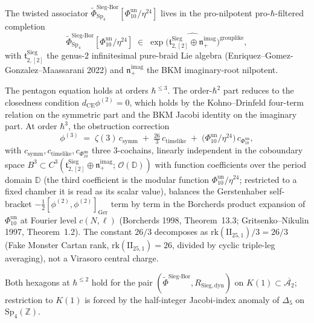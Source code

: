 \begin{theorem}
\label{thm:qca-pentagon-hexagon-sieg-bor}
The twisted associator
$\widetilde{\Phi}^{\mathrm{Sieg\text{-}Bor}}_{\mathrm{Sp}_4}[\Phi_{10}^{\mathrm{un}}/\eta^{24}]$
lives in the pro-nilpotent pro-$\hbar$-filtered completion
\[
 \widetilde{\Phi}^{\mathrm{Sieg\text{-}Bor}}_{\mathrm{Sp}_4}[\Phi_{10}^{\mathrm{un}}/\eta^{24}]
 \;\in\;
 \exp\bigl(\widehat{\mathfrak{t}^{\mathrm{Sieg}}_{2,[2]}\oplus\mathfrak{n}_+^{\mathrm{imag}}}\bigr)^{\mathrm{grouplike}},
\]
with $\mathfrak{t}^{\mathrm{Sieg}}_{2,[2]}$ the genus-$2$ infinitesimal pure-braid
Lie algebra (Enriquez--Gomez-Gonzalez--Maassarani 2022) and
$\mathfrak{n}_+^{\mathrm{imag}}$ the BKM imaginary-root nilpotent.

The pentagon equation holds at orders $\hbar^{\leq 3}$. The order-$\hbar^2$ part
reduces to the closedness condition $d_{\mathrm{CE}}\phi^{(2)} = 0$, which holds
by the Kohno--Drinfeld four-term relation on the symmetric part and the BKM
Jacobi identity on the imaginary part. At order $\hbar^3$, the obstruction
correction
\[
 \phi^{(3)}
 \;=\;
 \zeta(3)\,c_{\mathrm{symm}}
 \;+\;
 \tfrac{26}{3}\,c_{\mathrm{timelike}}
 \;+\;
 \bigl(\Phi_{10}^{\mathrm{un}}/\eta^{24}\bigr)\,c_{\Phi_{10}^{\mathrm{un}}},
\]
with $c_{\mathrm{symm}},c_{\mathrm{timelike}},c_{\Phi_{10}^{\mathrm{un}}}$ three
$3$-cochains, linearly independent in the coboundary space
$B^3 \subset C^3(\mathfrak{t}^{\mathrm{Sieg}}_{2,[2]}\oplus\mathfrak{n}_+^{\mathrm{imag}};\,\mathcal{O}(\mathbb{D}))$
with function coefficients over the period domain $\mathbb{D}$ (the third
coefficient is the modular function $\Phi_{10}^{\mathrm{un}}/\eta^{24}$;
restricted to a fixed chamber it is read as its scalar value),
balances the Gerstenhaber self-bracket $-\frac{1}{2}[\phi^{(2)},\phi^{(2)}]_{\mathrm{Ger}}$
term by term in the Borcherds product expansion of $\Phi_{10}^{\mathrm{un}}$ at Fourier level
$c(N,\ell)$ (Borcherds 1998, Theorem~13.3; Gritsenko--Nikulin 1997, Theorem~1.2).
The constant $26/3$ decomposes as $\mathrm{rk}(\mathrm{II}_{25,1})/3 = 26/3$ (Fake Monster
Cartan rank, $\mathrm{rk}(\mathrm{II}_{25,1}) = 26$, divided by cyclic triple-leg
averaging), not a Virasoro central charge.

Both hexagons at $\hbar^{\leq 2}$ hold for the pair
$(\widetilde{\Phi}^{\mathrm{Sieg\text{-}Bor}},R_{\mathrm{Sieg,dyn}})$ on
$K(1)\subset\overline{\mathcal{A}_2}$; restriction to $K(1)$ is forced by the
half-integer Jacobi-index anomaly of $\Delta_5$ on $\mathrm{Sp}_4(\mathbb{Z})$.
\end{theorem}

